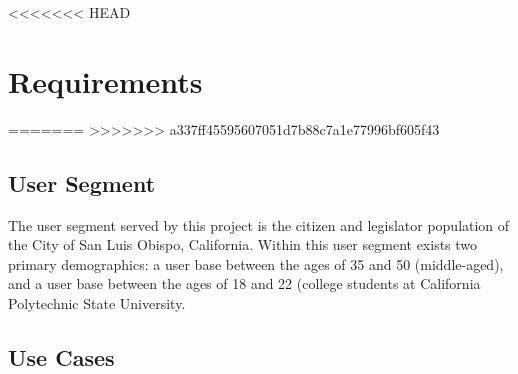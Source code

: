 <<<<<<< HEAD
\section{Requirements}
=======
>>>>>>> a337ff45595607051d7b88c7a1e77996bf605f43

\subsection{User Segment}
The user segment served by this project is the citizen and legislator population of
the City of San Luis Obispo, California. Within this user segment
exists two primary demographics: a user base between the ages of 35 and 50
(middle-aged), and a user base between the ages of 18 and 22 (college students
at California Polytechnic State University.
\subsection{Use Cases}


